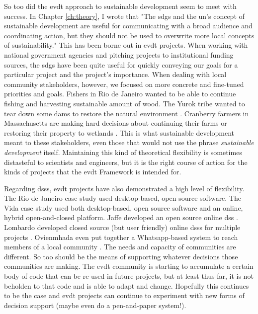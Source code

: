 So too did the \ac{evdt} approach to sustainable development seem to meet with success. In Chapter \ref{ch:theory}, I wrote that "The \acp{sdg} and the \ac{un}'s concept of sustainable development are useful for communicating with a broad audience and coordinating action, but they should not be used to overwrite more local concepts of sustainability." This has been borne out in \ac{evdt} projects. When working with national government agencies and pitching projects to institutional funding sources, the \acp{sdg} have been quite useful for quickly conveying our goals for a particular project and the project's importance. When dealing with local community stakeholders, however, we focused on more concrete and fine-tuned priorities and goals. Fishers in Rio de Janeiro wanted to be able to continue fishing and harvesting sustainable amount of wood. The Yurok tribe wanted to tear down some dams to restore the natural environment \cite{lombardoUtilizingSatelliteEarth2022}. Cranberry farmers in Massachusetts are making hard decisions about continuing their farms or restoring their property to wetlands \cite{jaffeEnvironmentalEconomicSystems2022}. This is what sustainable development meant to these stakeholders, even those that would not use the phrase \textit{sustainable development} itself. Maintaining this kind of theoretical flexibility is sometimes distasteful to scientists and engineers, but it is the right course of action for the kinds of projects that the \ac{evdt} Framework is intended for.

Regarding \acp{dss}, \ac{evdt} projects have also demonstrated a high level of flexibility. The Rio de Janeiro case study used desktop-based, open source software. The Vida case study used both desktop-based, open source software and an online, hybrid open-and-closed platform. Jaffe developed an open source online \ac{dss} \cite{jaffeEnvironmentalEconomicSystems2022}. Lombardo developed closed source (but user friendly) online \acp{dss} for multiple projects \cite{lombardoDecisionSupportSystems2023}. Ovienmhada even put together a Whatsapp-based system to reach members of a local community \cite{ovienmhadaEarthObservationTechnology2020}. The needs and capacity of communities are different. So too should be the means of supporting whatever decisions those communities are making. The \ac{evdt} community is starting to accumulate a certain body of code that can be re-used in future projects, but at least thus far, it is not beholden to that code and is able to adapt and change. Hopefully this continues to be the case and \ac{evdt} projects can continue to experiment with new forms of decision support (maybe even do a pen-and-paper system!).


